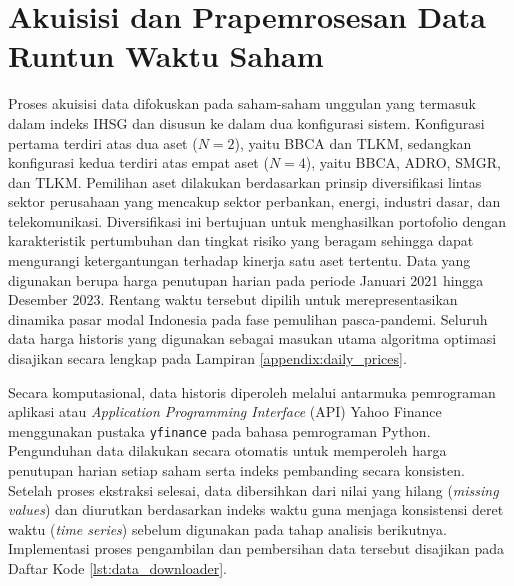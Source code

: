 \section{Akuisisi dan Prapemrosesan Data Runtun Waktu Saham}
\label{sec:4_1_akuisisi_data}

Proses akuisisi data difokuskan pada saham-saham unggulan yang termasuk dalam indeks IHSG dan disusun ke dalam dua konfigurasi sistem. Konfigurasi pertama terdiri atas dua aset ($N=2$), yaitu BBCA dan TLKM, sedangkan konfigurasi kedua terdiri atas empat aset ($N=4$), yaitu BBCA, ADRO, SMGR, dan TLKM. Pemilihan aset dilakukan berdasarkan prinsip diversifikasi lintas sektor perusahaan yang mencakup sektor perbankan, energi, industri dasar, dan telekomunikasi. Diversifikasi ini bertujuan untuk menghasilkan portofolio dengan karakteristik pertumbuhan dan tingkat risiko yang beragam sehingga dapat mengurangi ketergantungan terhadap kinerja satu aset tertentu. Data yang digunakan berupa harga penutupan harian pada periode Januari 2021 hingga Desember 2023. Rentang waktu tersebut dipilih untuk merepresentasikan dinamika pasar modal Indonesia pada fase pemulihan pasca-pandemi. Seluruh data harga historis yang digunakan sebagai masukan utama algoritma optimasi disajikan secara lengkap pada Lampiran \ref{appendix:daily_prices}.

Secara komputasional, data historis diperoleh melalui antarmuka pemrograman aplikasi atau \textit{Application Programming Interface} (API) Yahoo Finance menggunakan pustaka \texttt{yfinance} pada bahasa pemrograman Python. Pengunduhan data dilakukan secara otomatis untuk memperoleh harga penutupan harian setiap saham serta indeks pembanding secara konsisten. Setelah proses ekstraksi selesai, data dibersihkan dari nilai yang hilang (\textit{missing values}) dan diurutkan berdasarkan indeks waktu guna menjaga konsistensi deret waktu (\textit{time series}) sebelum digunakan pada tahap analisis berikutnya. Implementasi proses pengambilan dan pembersihan data tersebut disajikan pada Daftar Kode \ref{lst:data_downloader}.

